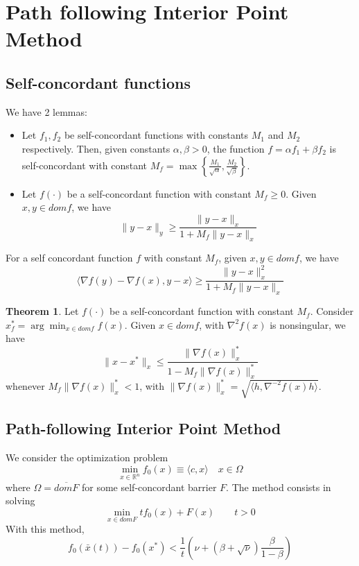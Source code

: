 \documentclass[12pt, openany]{report}
\newcommand{\R}{\mathbb{R}}
\theoremstyle{definition}
\newtheorem{thm}{Theorem}[chapter]
\begin{document}
\section{Path following Interior Point Method}
\subsection{Self-concordant functions}
We have 2 lemmas:
\begin{itemize}
	\item Let $f_1,f_2$ be self-concordant functions with constants $M_1$ and $M_2$ respectively. Then, given constants $\alpha,\beta>0$, the function $f=\alpha f_1 + \beta f_2$ is self-concordant with constant $M_f = \max\left\{\frac{M_1}{\sqrt{\alpha}}, \frac{M_2}{\sqrt{\beta}}\right\}$.
	\item Let $f(\cdot)$ be a self-concordant function with constant $M_f\ge 0$. Given $x,y\in domf$, we have 
	\begin{equation}
		\|y-x\|_y \ge \frac{\|y-x\|_x}{1+M_f \|y-x\|_x}
	\end{equation}
\end{itemize}
For a self concordant function $f$ with constant $M_f$, given $x,y\in domf$, we have 
\begin{equation}
	\langle \nabla f(y)-\nabla f(x),y-x\rangle \ge \frac{\|y-x\|_x^2}{1+M_f\|y-x\|_x}
\end{equation}
\begin{thm}
	Let $f(\cdot)$ be a self-concordant function with constant $M_f$. Consider $x_f^* = \arg\min_{x\in domf}f(x)$. Given $x\in domf$, with $\nabla^2 f(x)$ is nonsingular, we have 
	\begin{equation}
		\|x-x^*\|_x \le \frac{\|\nabla f(x)\|_x^*}{1-M_f\|\nabla f(x)\|_x^*}
	\end{equation}
	whenever $M_f\|\nabla f(x)\|_x^* < 1$, with $\|\nabla f(x)\|_x^* = \sqrt{\langle h, \nabla^{-2}f(x)h\rangle}$.
\end{thm}
\subsection{Path-following Interior Point Method}
We consider the optimization problem 
\begin{equation}
	\min_{x\in \R^n} f_0(x)\equiv \langle c,x\rangle \quad x\in \Omega
\end{equation}
where $\Omega = \overline{domF}$ for some self-concordant barrier $F$. The method consists in solving 
\begin{equation}
	\min_{x\in domF}tf_0(x) + F(x)\qquad t>0
\end{equation}
With this method, 
\begin{equation}
	f_0(\bar x(t)) - f_0(x^*) < \frac{1}{t}\left(\nu + (\beta +\sqrt{\nu}) \frac{\beta}{1-\beta}\right)
\end{equation}
\end{document}
